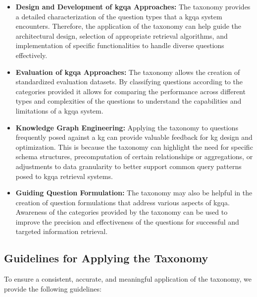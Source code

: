 \begin{itemize}
    \item \textbf{Design and Development of \gls{kgqa} Approaches:} The taxonomy provides a detailed characterization of the question types that a \gls{kgqa} system encounters. Therefore, the application of the taxonomy can help guide the architectural design, selection of appropriate retrieval algorithms, and implementation of specific functionalities to handle diverse questions effectively.
    
    \item \textbf{Evaluation of \gls{kgqa} Approaches:} The taxonomy allows the creation of standardized evaluation datasets. By classifying questions according to the categories provided it allows for comparing the performance across different types and complexities of the questions to understand the capabilities and limitations of a \gls{kgqa} system.

    \item \textbf{Knowledge Graph Engineering:} Applying the taxonomy to questions frequently posed against a \gls{kg} can provide valuable feedback for \gls{kg} design and optimization. This is because the taxonomy can highlight the need for specific schema structures, precomputation of certain relationships or aggregations, or adjustments to data granularity to better support common query patterns posed to \gls{kgqa} retrieval systems.

    \item \textbf{Guiding Question Formulation:} The taxonomy may also be helpful in the creation of question formulations that address various aspects of \gls{kgqa}. Awareness of the categories provided by the taxonomy can be used to improve the precision and effectiveness of the questions for successful and targeted information retrieval.
\end{itemize}


\subsection{Guidelines for Applying the Taxonomy}
\label{sec:guidelines_for_the_application}

To ensure a consistent, accurate, and meaningful application of the taxonomy, we provide the following guidelines:

